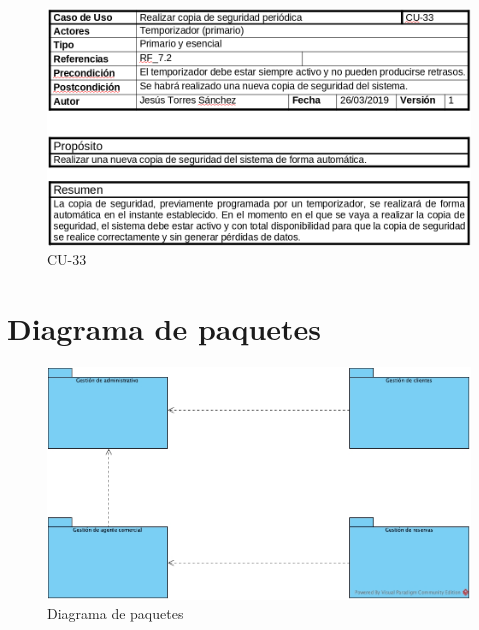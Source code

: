 \documentclass{article}
\begin{document}
	\begin{figure}[H]
		\centering
		\includegraphics[totalheight=8cm]{cu-33}
		\caption{CU-33}
		\label{fig:cu-33}
	\end{figure}

	\section{Diagrama de paquetes}
	
	\begin{figure}[H]
		\centering
		\includegraphics[totalheight=8cm]{diagrama_de_paquetes}
		\caption{Diagrama de paquetes}
		\label{fig:paquetes}
	\end{figure}
	
\end{document}
